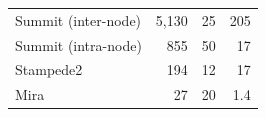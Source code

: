 \documentclass[aspectratio=169]{beamer}
\begin{document}
\begin{frame}
\begin{columns}
\begin{column}{0.7\textwidth}
{\begin{table}[]
\begin{tabular}{lrrr}
          Summit (inter-node) & 5,130         & 25          & 205     \\
          Summit (intra-node) & 855          & 50          & 17      \\
          Stampede2           & 194          & 12          & 17      \\
          Mira                & 27           & 20          & 1.4
        \end{tabular}
      \end{table}
      }
    \end{column}
  \end{columns}
\end{frame}
\end{document}
